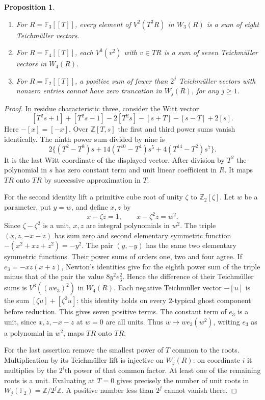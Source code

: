 \documentclass[11pt,letterpaper]{article}
\newtheorem{proposition}[proposition]{Proposition}
\theoremstyle{definition}
\numberwithin{equation}{section}
\begin{document}
\begin{proposition}\label{prop:small-residue-carries}
\begin{enumerate}
\item For $R=\mathbb F_3[[T]]$, every element of $V^2(T^3R)$ in
$W_3(R)$ is a sum of eight Teichm\"uller vectors.
\item For $R=\mathbb F_4[[T]]$, each $V^3(v^2)$ with $v\in TR$ is
a sum of seven Teichm\"uller vectors in $W_4(R)$.
\item For $R=\mathbb F_2[[T]]$, a positive sum of fewer than $2^j$
Teichm\"uller vectors with nonzero entries cannot have zero
truncation in $W_j(R)$, for any $j\ge1$.
\end{enumerate}
\end{proposition}
\begin{proof}
In residue characteristic three, consider the Witt vector
\[
 [T^2s+1]+[T^2s-1]-2[T^2s]-[s+T]-[s-T]+2[s].
\]
Here $-[x]=[-x]$. Over $\mathbb Z[T,s]$ the first and third
power sums vanish identically. The ninth power sum divided by nine is
\[
 2\{(T^2-T^8)s+14(T^{10}-T^4)s^5+4(T^{14}-T^2)s^7\}.
\]
It is the last Witt coordinate of the displayed vector. After division
by $T^2$ the polynomial in $s$ has zero constant term and unit linear
coefficient in $R$. It maps $TR$ onto $TR$ by successive approximation
in $T$.

For the second identity lift a primitive cube root of unity $\zeta$
to $\mathbb Z_2[\zeta]$. Let $w$ be a parameter, put $y=w$, and
define $x,z$ by
\[
                   x-\zeta z=1,\qquad x-\zeta^2 z=w^2.
\]
Since $\zeta-\zeta^2$ is a unit, $x,z$ are integral polynomials in
$w^2$. The triple $(x,z,-x-z)$ has sum zero and second elementary
symmetric function $-(x^2+xz+z^2)=-y^2$. The pair $(y,-y)$ has
the same two elementary symmetric functions. Their power sums
of orders one, two and four agree. If $e_3=-xz(x+z)$, Newton's
identities give for the eighth power sum of the triple minus that of
the pair the value $8y^2 e_3^2$. Hence the difference of their
Teichm\"uller sums is $V^3((w e_3)^2)$ in $W_4(R)$. Each negative
Teichm\"uller vector $-[u]$ is the sum $[\zeta u]+[\zeta^2u]$:
this identity holds on every $2$-typical ghost component before
reduction. This gives seven positive terms. The constant term of
$e_3$ is a unit, since $x,z,-x-z$ at $w=0$ are all units.
Thus $w\mapsto w e_3(w^2)$, writing $e_3$ as a polynomial in $w^2$,
maps $TR$ onto $TR$.

For the last assertion remove the smallest power of $T$ common to
the roots. Multiplication by its Teichm\"uller lift is injective on
$W_j(R)$: on coordinate $i$ it multiplies by the $2^i$th power
of that common factor. At least one of the remaining roots is a
unit. Evaluating at $T=0$ gives precisely the number of unit roots
in $W_j(\mathbb F_2)=\mathbb Z/2^j\mathbb Z$. A positive number
less than $2^j$ cannot vanish there.
\end{proof}
\end{document}
